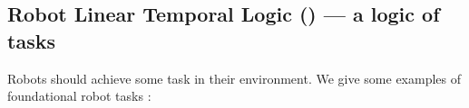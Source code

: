 %
%
%
%
%
%
%
%


\subsection{Robot Linear Temporal Logic (\RLTL) --- a logic of tasks} \label{sec:TL}
%
%
%
Robots should achieve some task in their environment.
We give some examples of foundational robot tasks \cite{KKR07handbook}:

